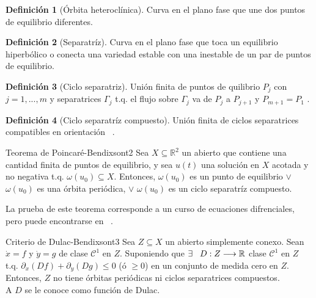 \documentclass[10pt,oneside]{article}
\theoremstyle{definition}
\newtheorem{definition}{Definición}[section]
\begin{document}
\begin{multicols}{2}
    \begin{definition}[Órbita  heteroclínica]
        Curva en el plano fase que une dos puntos de equilibrio diferentes.
    \end{definition}
    
    \begin{definition}[Separatríz]
        Curva en el plano fase que toca un equilibrio hiperbólico o conecta una variedad estable con una inestable de un par de puntos de equilibrio.
    \end{definition}
    
    \begin{definition}[Ciclo separatriz]
        Unión finita de puntos de quilibrio $P_j$ con $j=1,...,m$ y separatrices $\Gamma_j$ t.q. el flujo sobre $\Gamma_j$ va de $P_j$ a $P_{j+1}$ y $P_{m+1}=P_1$ .
    \end{definition}

    \begin{definition}[Ciclo separatríz compuesto]
        Unión finita de ciclos separatrices compatibles en orientación ~\cite{Mod:epid}.
    \end{definition}

    \begin{theorems}{Teorema de Poincaré-Bendixson}{t2}
        Sea $X\subseteq\mathbb{R}^2$ un abierto que contiene una cantidad finita de puntos de equilibrio, y sea $u(t)$ una solución en $X$ acotada y no negativa t.q. $\omega(u_0)\subseteq X$. Entonces, $\omega(u_0)$ es un punto de equilibrio $\lor$ $\omega(u_0)$ es una órbita periódica, $\lor$ $\omega(u_0)$ es un ciclo separatríz compuesto.   
    \end{theorems}

    La prueba de este teorema corresponde a un curso de ecuaciones difrenciales, pero puede encontrarse en ~\cite{PBteorema}.

    \begin{theorems}{Criterio de Dulac-Bendixson}{t3}
        Sea $Z\subseteq X $ un abierto simplemente conexo. Sean $\dot x=f$ y $\dot y=g$ de clase $\mathcal{C}^{1}$ en $Z$. Suponiendo que $\exists\hspace{0.3cm}D: Z\longrightarrow\mathbb{R}$ clase $\mathcal{C}^{1}$ en $Z$ t.q. $\partial_x(Df)+\partial_y(Dg)\leq 0$ (ó $\geq0$) en un conjunto de medida cero en $Z$. Entonces, $Z$ no tiene órbitas periódicas ni ciclos separatrices compuestos. \\ \newline A $D$ se le conoce como función de Dulac. 
    \end{theorems}


\end{multicols}
\end{document}
